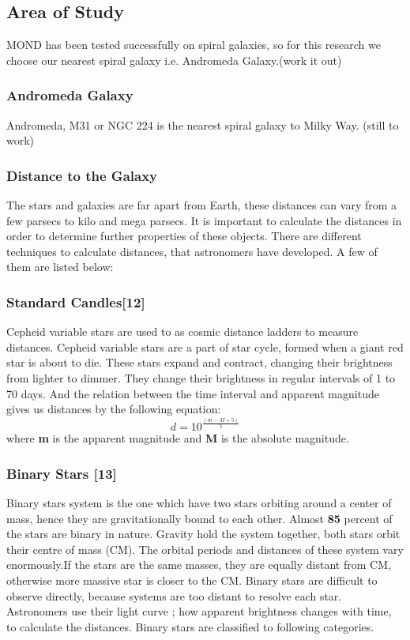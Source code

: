 \documentclass{article}
\begin{document}
\subsection{Area of Study}
  MOND has been tested successfully on spiral galaxies, so for this research we choose our nearest spiral galaxy i.e. Andromeda Galaxy.(work it out)
  \subsubsection{Andromeda Galaxy}
  Andromeda, M31 or NGC 224 is the nearest spiral galaxy to Milky Way.  (still to work)
\subsubsection{Distance to the Galaxy}
The stars and galaxies are far apart from Earth, these distances can vary from a few parsecs to kilo and mega parsecs. It is important to calculate the distances in order to determine further properties of these objects. There are different techniques to calculate distances, that astronomers have developed. 
A few of them are listed below:
\subsubsection{Standard Candles[12]}
 Cepheid variable stars are used to as cosmic distance ladders to measure distances. Cepheid variable stars are a part of star cycle, formed when a giant red star is about to die. These stars expand and contract, changing their brightness from lighter to dimmer.  They change their brightness in regular intervals of 1 to 70 days. And the relation between the time interval and apparent magnitude gives us distances by the following equation:
 \begin{equation}
 d= 10^{\frac{(m-M+5)}{5}}
 \end{equation}
where \textbf{m} is the apparent magnitude and \textbf{M} is the absolute magnitude.
\subsubsection*{Binary Stars [13]}
Binary stars system is the one which have two stars orbiting around a center of mass, hence they are gravitationally bound to each other. Almost \textbf{85} percent of the stars are binary in nature. Gravity hold the system together, both stars orbit their centre of mass (CM). The orbital periods and distances of these system vary enormously.If the stars are the same masses, they are equally distant from CM, otherwise more massive star is closer to the CM. Binary stars are difficult to observe directly, because systems are too distant to resolve each star. Astronomers use their light curve ; how apparent brightness changes with time, to calculate the distances. Binary stars are classified to following categories.
\end{document}
